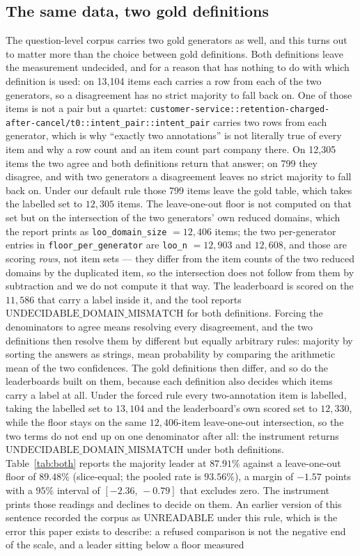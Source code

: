 \documentclass{article}
\begin{document}
\subsection{The same data, two gold definitions}
\label{sec:both} The question-level corpus carries two gold generators as well, and this turns out to matter more than the choice between gold definitions. Both definitions leave the measurement undecided, and for a reason that has nothing to do with which definition is used: on 13,104 items each carries a row from each of the two generators, so a disagreement has no strict majority to fall back on. One of those items is not a pair but a quartet: \texttt{customer-service::retention-charged-after-}\allowbreak\texttt{cancel/t0::intent\_pair::}\allowbreak\texttt{intent\_pair} carries two rows from each generator, which is why ``exactly two annotations'' is not literally true of every item and why a row count and an item count part company there. On 12,305 items the two agree and both definitions return that answer; on 799 they disagree, and with two generators a disagreement leaves no strict majority to fall back on. Under our default rule those 799 items leave the gold table, which takes the labelled set to $12,305$ items. The leave-one-out floor is not computed on that set but on the intersection of the two generators' own reduced domains, which the report prints as \texttt{loo\_domain\_size} $=12,406$ items; the two per-generator entries in \texttt{floor\_per\_generator} are \texttt{loo\_n} $=12,903$ and $12,608$, and those are scoring \emph{rows}, not item sets --- they differ from the item counts of the two reduced domains by the duplicated item, so the intersection does not follow from them by subtraction and we do not compute it that way. The leaderboard is scored on the $11,586$ that carry a label inside it, and the tool reports $\mathrm{UNDECIDABLE\_DOMAIN\_MISMATCH}$ for both definitions. Forcing the denominators to agree means resolving every disagreement, and the two definitions then resolve them by different but equally arbitrary rules: majority by sorting the answers as strings, mean probability by comparing the arithmetic mean of the two confidences. The gold definitions then differ, and so do the leaderboards built on them, because each definition also decides which items carry a label at all. Under the forced rule every two-annotation item is labelled, taking the labelled set to $13,104$ and the leaderboard's own scored set to $12,330$, while the floor stays on the same $12,406$-item leave-one-out intersection, so the two terms do not end up on one denominator after all: the instrument returns $\mathrm{UNDECIDABLE\_DOMAIN\_MISMATCH}$ under both definitions. Table~\ref{tab:both} reports the majority leader at $87.91\%$ against a leave-one-out floor of $89.48\%$ (slice-equal; the pooled rate is $93.56\%$), a margin of $-1.57$ points with a $95\%$ interval of $[-2.36,\,-0.79]$ that excludes zero. The instrument prints those readings and declines to decide on them. An earlier version of this sentence recorded the corpus as $\mathrm{UNREADABLE}$ under this rule, which is the error this paper exists to describe: a refused comparison is not the negative end of the scale, and a leader sitting below a floor measured 
\end{document}

